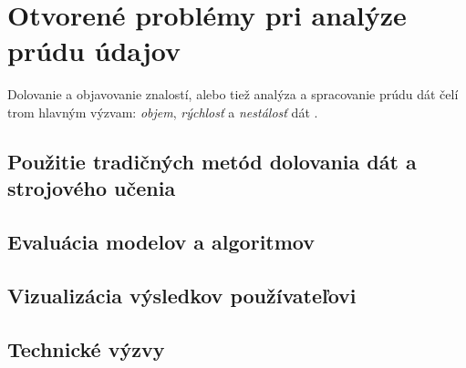 \chapter{Otvorené problémy pri analýze prúdu údajov}
\label{Otvorené problémy pri analýze prúdu údajov}
Dolovanie a objavovanie znalostí, alebo tiež analýza a spracovanie prúdu dát čelí trom hlavným výzvam: \textit{objem}, \textit{rýchlosť} a \textit{nestálosť} dát \citep{krempl2014open}. 

\section{Použitie tradičných metód dolovania dát a strojového učenia}

\section{Evaluácia modelov a algoritmov}

\section{Vizualizácia výsledkov používateľovi}

\section{Technické výzvy}
